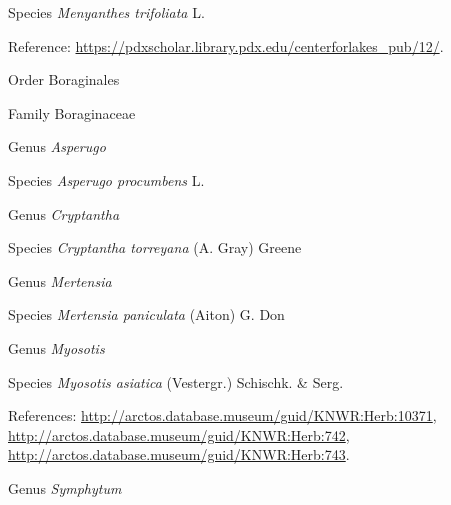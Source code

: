 \documentclass[9pt, article]{memoir}
\begin{document}
\begin{multicols}{2}
\vspace{6pt}\noindent\hspace{36pt}Species \textit{Menyanthes trifoliata} L.


\vspace{6pt}Reference: 
\url{https://pdxscholar.library.pdx.edu/centerforlakes_pub/12/}.

\vspace{6pt}\noindent\hspace{18pt}Order Boraginales


\vspace{6pt}\noindent\hspace{24pt}Family Boraginaceae


\vspace{6pt}\noindent\hspace{30pt}Genus \textit{Asperugo}


\vspace{6pt}\noindent\hspace{36pt}Species \textit{Asperugo procumbens} L.


\vspace{6pt}\noindent\hspace{30pt}Genus \textit{Cryptantha}


\vspace{6pt}\noindent\hspace{36pt}Species \textit{Cryptantha torreyana} (A. Gray) Greene


\vspace{6pt}\noindent\hspace{30pt}Genus \textit{Mertensia}


\vspace{6pt}\noindent\hspace{36pt}Species \textit{Mertensia paniculata} (Aiton) G. Don


\vspace{6pt}\noindent\hspace{30pt}Genus \textit{Myosotis}


\vspace{6pt}\noindent\hspace{36pt}Species \textit{Myosotis asiatica} (Vestergr.) Schischk. \& Serg.


\vspace{6pt}References: 
\url{http://arctos.database.museum/guid/KNWR:Herb:10371}, 
\url{http://arctos.database.museum/guid/KNWR:Herb:742}, 
\url{http://arctos.database.museum/guid/KNWR:Herb:743}.

\vspace{6pt}\noindent\hspace{30pt}Genus \textit{Symphytum}



\end{multicols}
\end{document}
